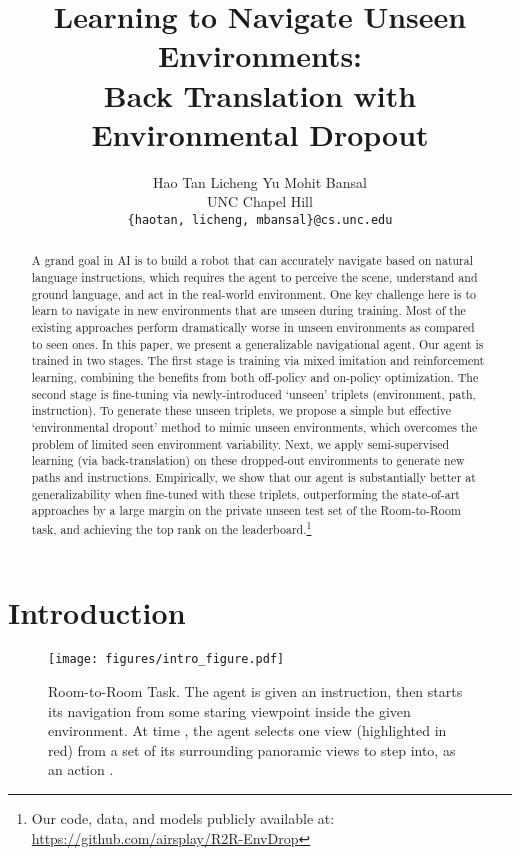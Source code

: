 \documentclass[11pt,a4paper]{article}
\title{
Learning to Navigate Unseen Environments: \\Back Translation with Environmental Dropout
}
\author{Hao Tan \;\;\;\;\;\;\; Licheng Yu \;\;\;\;\;\;\; Mohit Bansal \\
  UNC Chapel Hill \\
  {\tt \{haotan, licheng, mbansal\}@cs.unc.edu} \\
 }
\date{}
\begin{document}
\maketitle




\begin{abstract}
A grand goal in AI is to build a robot that can accurately navigate based on natural language instructions, which requires the agent to perceive the scene, understand and ground language, and act in the real-world environment. One key challenge here is to learn to navigate in new environments that are unseen during training. Most of the existing approaches perform dramatically worse in unseen environments as compared to seen ones.
In this paper, we present a generalizable navigational agent.
Our agent is trained in two stages.
The first stage is training via mixed imitation and reinforcement learning, combining the benefits from both off-policy and on-policy optimization.
The second stage is fine-tuning via newly-introduced `unseen' triplets (environment, path, instruction).
To generate these unseen triplets, we propose a simple but effective `environmental dropout' method to mimic unseen environments, which overcomes the problem of limited seen environment variability.
Next, we apply semi-supervised learning (via back-translation) on these dropped-out environments to generate new paths and instructions.
Empirically, we show that our agent is substantially better at generalizability when fine-tuned with these triplets, outperforming the state-of-art approaches by a large margin on the private unseen test set of the Room-to-Room task, and achieving the top rank on the leaderboard.\footnote{Our code, data, and models publicly available at: \url{https://github.com/airsplay/R2R-EnvDrop}}
\end{abstract}



\section{Introduction}
\begin{figure}[t]
\centering
\texttt{[image: figures/intro\_figure.pdf]}
\vspace{-0.2cm}
\caption{Room-to-Room Task. The agent is given an instruction, then starts its navigation from some staring viewpoint inside the given environment. At time , the agent selects one view (highlighted in red) from a set of its surrounding panoramic views to step into, as an action . 
}\label{fig:intro}
\vspace{-0.2cm}
\label{fig:pg}
\end{figure}
\end{document}
